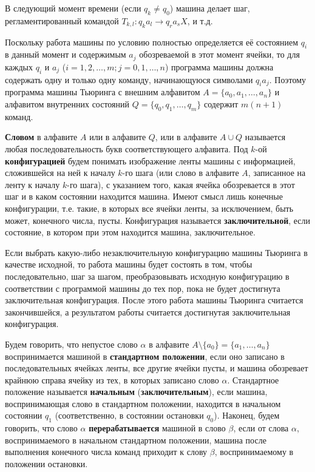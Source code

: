 \documentclass[a4paper,12pt]{article}
\begin{document}
В следующий момент времени (если \(q_k \neq q_0\)) машина делает шаг, регламентированный командой \(T_{k,l}: q_k a_l \to q_r a_s X\), и т.д.

Поскольку работа машины по условию полностью определяется её состоянием \(q_i\) в данный момент и содержимым \(a_j\) обозреваемой в этот момент ячейки, то для каждых \(q_i\) и \(a_j\) (\(i = 1, 2, \dots, m; j = 0, 1, \dots, n\)) программа машины должна содержать одну и только одну команду, начинающуюся символами \(q_i a_j\). Поэтому программа машины Тьюринга с внешним алфавитом \(A = \{a_0, a_1, \dots, a_n\}\) и алфавитом внутренних состояний \(Q = \{q_0, q_1, \dots, q_m\}\) содержит \(m(n + 1)\) команд.

\textbf{Словом} в алфавите \(A\) или в алфавите \(Q\), или в алфавите \(A \cup Q\) называется любая последовательность букв соответствующего алфавита. Под \(k\)-ой \textbf{конфигурацией} будем понимать изображение ленты машины с информацией, сложившейся на ней к началу \(k\)-го шага (или слово в алфавите \(A\), записанное на ленту к началу \(k\)-го шага), с указанием того, какая ячейка обозревается в этот шаг и в каком состоянии находится машина. Имеют смысл лишь конечные конфигурации, т.е. такие, в которых все ячейки ленты, за исключением, быть может, конечного числа, пусты. Конфигурация называется \textbf{заключительной}, если состояние, в котором при этом находится машина, заключительное.

Если выбрать какую-либо незаключительную конфигурацию машины Тьюринга в качестве исходной, то работа машины будет состоять в том, чтобы последовательно, шаг за шагом, преобразовывать исходную конфигурацию в соответствии с программой машины до тех пор, пока не будет достигнута заключительная конфигурация. После этого работа машины Тьюринга считается закончившейся, а результатом работы считается достигнутая заключительная конфигурация.

Будем говорить, что непустое слово \(\alpha\) в алфавите \(A \setminus \{a_0\} = \{a_1, \dots, a_n\}\) воспринимается машиной в \textbf{стандартном положении}, если оно записано в последовательных ячейках ленты, все другие ячейки пусты, и машина обозревает крайнюю справа ячейку из тех, в которых записано слово \(\alpha\). Стандартное положение называется \textbf{начальным} (\textbf{заключительным}), если машина, воспринимающая слово в стандартном положении, находится в начальном состоянии \(q_1\) (соответственно, в состоянии остановки \(q_0\)). Наконец, будем говорить, что слово \(\alpha\) \textbf{перерабатывается} машиной в слово \(\beta\), если от слова \(\alpha\), воспринимаемого в начальном стандартном положении, машина после выполнения конечного числа команд приходит к слову \(\beta\), воспринимаемому в положении остановки.
\end{document}
